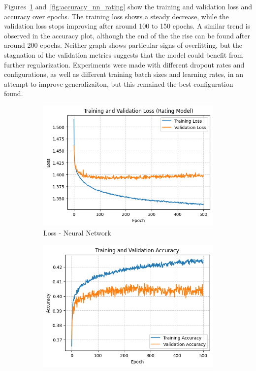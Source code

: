 Figures~\ref{fig:loss_nn_rating} and~\ref{fig:accuracy_nn_rating}
show the training and validation loss and accuracy over epochs.
The training loss shows a steady decrease, while the validation loss
stops improving after around 100 to 150 epochs.
A similar trend is observed in the accuracy plot, although the
end of the the rise can be found after around 200 epochs.
Neither graph shows particular signs of overfitting, but
the stagnation of the validation metrics suggests that the model
could benefit from further regularization.
Experiments were made with different dropout rates and configurations,
as well as different training batch sizes and learning rates,
in an attempt to improve generalizaiton, but this remained the
best configuration found.\\

\begin{figure}[H]
    \centering
    \begin{subfigure}[b]{0.48\textwidth}
        \centering
        \includegraphics[width=\textwidth]{plotsss/loss_rating.png}
        \caption{Loss - Neural Network}
        \label{fig:loss_nn_rating}
    \end{subfigure}
    \hfill
    \begin{subfigure}[b]{0.48\textwidth}
        \centering
        \includegraphics[width=\textwidth]{plotsss/accuracy_rating.png}

\end{subfigure}
\end{figure}

